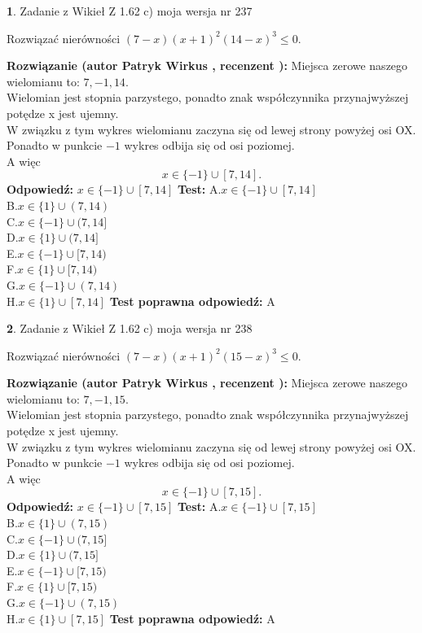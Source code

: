 \documentclass[12pt, a4paper]{article}
\theoremstyle{definition} %
\newtheorem{zad}{}
\newcommand{\zadStart}[1]{\begin{zad}#1\newline}
\newcommand{\zadStop}{\end{zad}}
\newcommand{\rozwStart}[2]{\noindent \textbf{Rozwiązanie (autor #1 , recenzent #2): }\newline}
\newcommand{\rozwStop}{\newline}
\newcommand{\odpStart}{\noindent \textbf{Odpowiedź:}\newline}
\newcommand{\odpStop}{\newline}
\newcommand{\testStart}{\noindent \textbf{Test:}\newline}
\newcommand{\testStop}{\newline}
\newcommand{\kluczStart}{\noindent \textbf{Test poprawna odpowiedź:}\newline}
\newcommand{\kluczStop}{\newline}
\begin{document}
\zadStart{Zadanie z Wikieł Z 1.62 c) moja wersja nr 237}

Rozwiązać nierówności $(7-x)(x+1)^{2}(14-x)^{3}\le0$.
\zadStop
\rozwStart{Patryk Wirkus}{}
Miejsca zerowe naszego wielomianu to: $7, -1, 14$.\\
Wielomian jest stopnia parzystego, ponadto znak współczynnika przy\linebreak najwyższej potędze x jest ujemny.\\ W związku z tym wykres wielomianu zaczyna się od lewej strony powyżej osi OX.\\
Ponadto w punkcie $-1$ wykres odbija się od osi poziomej.\\
A więc $$x \in \{-1\} \cup [7,14].$$
\rozwStop
\odpStart
$x \in \{-1\} \cup [7,14]$
\odpStop
\testStart
A.$x \in \{-1\} \cup [7,14]$\\
B.$x \in \{1\} \cup (7,14)$\\
C.$x \in \{-1\} \cup (7,14]$\\
D.$x \in \{1\} \cup (7,14]$\\
E.$x \in \{-1\} \cup [7,14)$\\
F.$x \in \{1\} \cup [7,14)$\\
G.$x \in \{-1\} \cup (7,14)$\\
H.$x \in \{1\} \cup [7,14]$
\testStop
\kluczStart
A
\kluczStop



\zadStart{Zadanie z Wikieł Z 1.62 c) moja wersja nr 238}

Rozwiązać nierówności $(7-x)(x+1)^{2}(15-x)^{3}\le0$.
\zadStop
\rozwStart{Patryk Wirkus}{}
Miejsca zerowe naszego wielomianu to: $7, -1, 15$.\\
Wielomian jest stopnia parzystego, ponadto znak współczynnika przy\linebreak najwyższej potędze x jest ujemny.\\ W związku z tym wykres wielomianu zaczyna się od lewej strony powyżej osi OX.\\
Ponadto w punkcie $-1$ wykres odbija się od osi poziomej.\\
A więc $$x \in \{-1\} \cup [7,15].$$
\rozwStop
\odpStart
$x \in \{-1\} \cup [7,15]$
\odpStop
\testStart
A.$x \in \{-1\} \cup [7,15]$\\
B.$x \in \{1\} \cup (7,15)$\\
C.$x \in \{-1\} \cup (7,15]$\\
D.$x \in \{1\} \cup (7,15]$\\
E.$x \in \{-1\} \cup [7,15)$\\
F.$x \in \{1\} \cup [7,15)$\\
G.$x \in \{-1\} \cup (7,15)$\\
H.$x \in \{1\} \cup [7,15]$
\testStop
\kluczStart
A
\kluczStop
\end{document}
